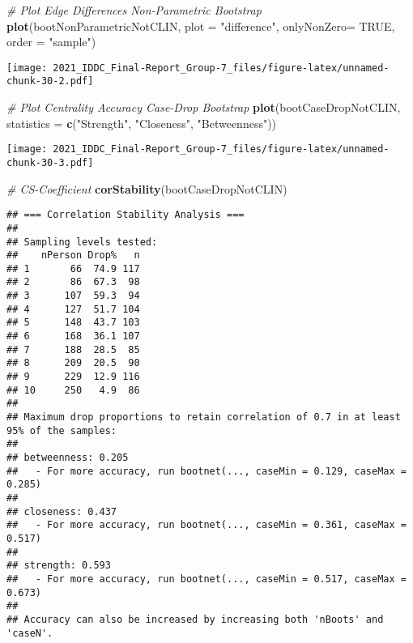 \documentclass[
]{article}
\newenvironment{Shaded}{\begin{snugshade}}{\end{snugshade}}
\newcommand{\CommentTok}[1]{\textcolor[rgb]{0.56,0.35,0.01}{\textit{#1}}}
\newcommand{\DataTypeTok}[1]{\textcolor[rgb]{0.13,0.29,0.53}{#1}}
\newcommand{\KeywordTok}[1]{\textcolor[rgb]{0.13,0.29,0.53}{\textbf{#1}}}
\newcommand{\NormalTok}[1]{#1}
\newcommand{\OtherTok}[1]{\textcolor[rgb]{0.56,0.35,0.01}{#1}}
\newcommand{\StringTok}[1]{\textcolor[rgb]{0.31,0.60,0.02}{#1}}
\begin{document}
\begin{Shaded}
\begin{Highlighting}[]
\CommentTok{# Plot Edge Differences Non-Parametric Bootstrap}
\KeywordTok{plot}\NormalTok{(bootNonParametricNotCLIN,}
     \DataTypeTok{plot =} \StringTok{"difference"}\NormalTok{,}
     \DataTypeTok{onlyNonZero=} \OtherTok{TRUE}\NormalTok{,}
     \DataTypeTok{order =} \StringTok{"sample"}\NormalTok{)}
\end{Highlighting}
\end{Shaded}

\texttt{[image: 2021\_IDDC\_Final-Report\_Group-7\_files/figure-latex/unnamed-chunk-30-2.pdf]}

\begin{Shaded}
\begin{Highlighting}[]
\CommentTok{# Plot Centrality Accuracy Case-Drop Bootstrap}
\KeywordTok{plot}\NormalTok{(bootCaseDropNotCLIN,}
     \DataTypeTok{statistics =} \KeywordTok{c}\NormalTok{(}\StringTok{"Strength"}\NormalTok{, }\StringTok{"Closeness"}\NormalTok{, }\StringTok{"Betweenness"}\NormalTok{))}
\end{Highlighting}
\end{Shaded}

\texttt{[image: 2021\_IDDC\_Final-Report\_Group-7\_files/figure-latex/unnamed-chunk-30-3.pdf]}

\begin{Shaded}
\begin{Highlighting}[]
\CommentTok{# CS-Coefficient}
\KeywordTok{corStability}\NormalTok{(bootCaseDropNotCLIN)}
\end{Highlighting}
\end{Shaded}

\begin{verbatim}
## === Correlation Stability Analysis === 
## 
## Sampling levels tested:
##    nPerson Drop%   n
## 1       66  74.9 117
## 2       86  67.3  98
## 3      107  59.3  94
## 4      127  51.7 104
## 5      148  43.7 103
## 6      168  36.1 107
## 7      188  28.5  85
## 8      209  20.5  90
## 9      229  12.9 116
## 10     250   4.9  86
## 
## Maximum drop proportions to retain correlation of 0.7 in at least 95% of the samples:
## 
## betweenness: 0.205 
##   - For more accuracy, run bootnet(..., caseMin = 0.129, caseMax = 0.285) 
## 
## closeness: 0.437 
##   - For more accuracy, run bootnet(..., caseMin = 0.361, caseMax = 0.517) 
## 
## strength: 0.593 
##   - For more accuracy, run bootnet(..., caseMin = 0.517, caseMax = 0.673) 
## 
## Accuracy can also be increased by increasing both 'nBoots' and 'caseN'.
\end{verbatim}
\end{document}
